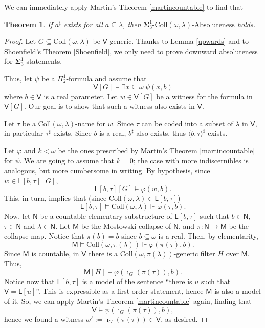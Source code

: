 \documentclass[10pt]{amsart}
\renewcommand\le\leqslant
\newtheorem{theorem}{Theorem}[section]
\theoremstyle{definition}
\begin{document}
We can immediately apply Martin's Theorem \ref{martincountable} to find that

\begin{theorem}\label{martincons}
If $a^\sharp$ exists for all $a\subseteq\lambda$, then $ \boldsymbol\Sigma^1_3\text{-}\mathrm{Coll}(\omega,\lambda)\text{-Absoluteness}$ holds.%
\end{theorem}


\begin{proof}
Let $G\subseteq\mathrm{Coll}(\omega,\lambda)$ be $\mathsf V$-generic. Thanks to Lemma \ref{upwards} and to Shoenfield's Theorem \ref{Shoenfield}, we only need to prove downward absoluteness for $\boldsymbol\Sigma^1_3$-statements.\medskip

Thus, let $\psi$ be a $\Pi^1_2$-formula and assume that
\[\mathsf V[G]\models \exists x\subseteq\omega\ \psi(x,b)\]
where $b\in\mathsf V$ is a real parameter. Let $w\in\mathsf V[G]$ be a witness for the formula in $\mathsf V[G]$. Our goal is to show that such a witness also exists in $\mathsf V$.\medskip

Let $\tau$ be a $\mathrm{Coll}(\omega,\lambda)$-name for $w$. Since $\tau$ can be coded into a subset of $\lambda$ in $\mathsf V$, in particular $\tau^\sharp$ exists. Since $b$ is a real, $b^\sharp$ also exists, thus $\langle b,\tau\rangle^\sharp$ exists.\medskip

Let $\varphi$ and $k<\omega$ be the ones prescribed by Martin's Theorem \ref{martincountable} for $\psi$. We are going to assume that $k=0$; the case with more indiscernibles is analogous, but more cumbersome in writing. By hypothesis, since $w\in \mathsf L[b,\tau][G]$,
\[\mathsf L[b,\tau][G] \models \varphi(w,b).\]
This, in turn, implies that (since $\mathrm{Coll}(\omega,\lambda)\in\mathsf L[b,\tau]$)
\[\mathsf L[b,\tau] \models \mathrm{Coll}(\omega,\lambda)\Vdash \varphi(\tau,b).\]
Now, let $\mathsf N$ be a countable elementary substructure of $\mathsf L[b,\tau]$ such that $b\in\mathsf N$, $\tau\in \mathsf N$ and $\lambda\in\mathsf N$. Let $\mathsf M$ be the Mostowski collapse of $\mathsf N$, and $\pi:\mathsf N\to\mathsf M$ be the collapse map. Notice that $\pi(b)=b$ since $b\subseteq\omega$ is a real. Then, by elementarity,
\[\mathsf M\models \mathrm{Coll}(\omega,\pi(\lambda))\Vdash \varphi(\pi(\tau),b).\]
Since $\mathsf M$ is countable, in $\mathsf V$ there is a $\mathrm{Coll}(\omega,\pi(\lambda))$-generic filter $H$ over $\mathsf M$. Thus, \[\mathsf M[H]\models \varphi(\imath_G(\pi(\tau)),b).\]
Notice now that $\mathsf L[b,\tau]$ is a model of the sentence ``there is $u$ such that $\mathsf V=\mathsf L[u]$''. This is expressible as a first-order statement, hence $\mathsf M$ is also a model of it. So, we can apply Martin's Theorem \ref{martincountable} again, finding that
\[\mathsf V\models \psi(\imath_G(\pi(\tau)),b),\]
hence we found a witness $w':=\imath_G(\pi(\tau))\in\mathsf V$, as desired.
\end{proof}
\end{document}
